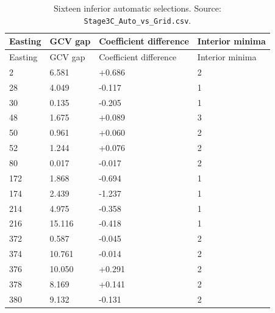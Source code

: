 \begin{longtable}{@{}p{1.8cm}p{2.6cm}p{3.8cm}p{2.7cm}@{}}
\caption{Sixteen inferior automatic selections. Source: \texttt{Stage3C\_Auto\_vs\_Grid.csv}.}\label{tab:sixteen-inferior-automatic-selections}\\
\toprule
Easting & GCV gap & Coefficient difference & Interior minima\\
\midrule
\endfirsthead
\toprule
Easting & GCV gap & Coefficient difference & Interior minima\\
\midrule
\endhead
2 & 6.581 & +0.686 & 2\\
28 & 4.049 & -0.117 & 1\\
30 & 0.135 & -0.205 & 1\\
48 & 1.675 & +0.089 & 3\\
50 & 0.961 & +0.060 & 2\\
52 & 1.244 & +0.076 & 2\\
80 & 0.017 & -0.017 & 2\\
172 & 1.868 & -0.694 & 1\\
174 & 2.439 & -1.237 & 1\\
214 & 4.975 & -0.358 & 1\\
216 & 15.116 & -0.418 & 1\\
372 & 0.587 & -0.045 & 2\\
374 & 10.761 & -0.014 & 2\\
376 & 10.050 & +0.291 & 2\\
378 & 8.169 & +0.141 & 2\\
380 & 9.132 & -0.131 & 2\\
\bottomrule
\end{longtable}
